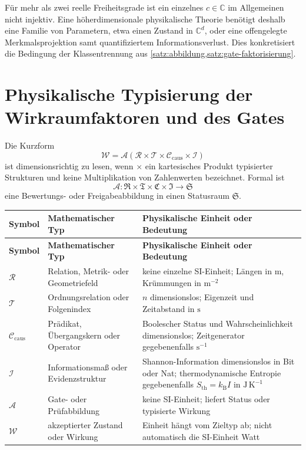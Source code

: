 \documentclass[11pt,a4paper]{article}
\theoremstyle{remark}
\newcommand{\C}{\mathbb{C}}
\begin{document}
Für mehr als zwei reelle Freiheitsgrade ist ein einzelnes \(c\in\C\) im
Allgemeinen nicht injektiv. Eine höherdimensionale physikalische Theorie
benötigt deshalb eine Familie von Parametern, etwa einen Zustand in \(\C^d\),
oder eine offengelegte Merkmalsprojektion samt quantifiziertem
Informationsverlust. Dies konkretisiert die Bedingung der
Klassentrennung aus \cref{satz:abbildung,satz:gate-faktorisierung}.

\section{Physikalische Typisierung der Wirkraumfaktoren und des Gates}
\label{sec:rtcia-typen}

Die Kurzform
\[
  \mathcal W=\mathcal A
  (\mathcal R\times\mathcal T\times\mathcal C_{\mathrm{caus}}\times\mathcal I)
\]
ist dimensionsrichtig zu lesen, wenn \(\times\) ein kartesisches Produkt
typisierter Strukturen und keine Multiplikation von Zahlenwerten bezeichnet.
Formal ist
\[
  \mathcal A:\mathfrak R\times\mathfrak T\times\mathfrak C\times
  \mathfrak I\longrightarrow\mathfrak S
\]
eine Bewertungs- oder Freigabeabbildung in einen Statusraum \(\mathfrak S\).

\begin{longtable}{>{\raggedright\arraybackslash}p{}
                  >{\raggedright\arraybackslash}p{}
                  >{\raggedright\arraybackslash}p{}}
\toprule
\textbf{Symbol} & \textbf{Mathematischer Typ} & \textbf{Physikalische Einheit oder Bedeutung} \\
\midrule
\endfirsthead
\toprule
\textbf{Symbol} & \textbf{Mathematischer Typ} & \textbf{Physikalische Einheit oder Bedeutung} \\
\midrule
\endhead
\(\mathcal R\) & Relation, Metrik- oder Geometriefeld & keine einzelne SI-Einheit; Längen in \(\mathrm m\), Krümmungen in \(\mathrm{m^{-2}}\) \\
\(\mathcal T\) & Ordnungsrelation oder Folgenindex & \(n\) dimensionslos; Eigenzeit und Zeitabstand in \(\mathrm s\) \\
\(\mathcal C_{\mathrm{caus}}\) & Prädikat, Übergangskern oder Operator & Boolescher Status und Wahrscheinlichkeit dimensionslos; Zeitgenerator gegebenenfalls \(\mathrm{s^{-1}}\) \\
\(\mathcal I\) & Informationsmaß oder Evidenzstruktur & Shannon-Information dimensionslos in Bit oder Nat; thermodynamische Entropie gegebenenfalls \(S_{\mathrm{th}}=k_{\mathrm B}I\) in \(\mathrm{J\,K^{-1}}\) \citep{shannon1948a} \\
\(\mathcal A\) & Gate- oder Prüfabbildung & keine SI-Einheit; liefert Status oder typisierte Wirkung \\
\(\mathcal W\) & akzeptierter Zustand oder Wirkung & Einheit hängt vom Zieltyp ab; nicht automatisch die SI-Einheit Watt \\
\bottomrule
\end{longtable}
\end{document}

